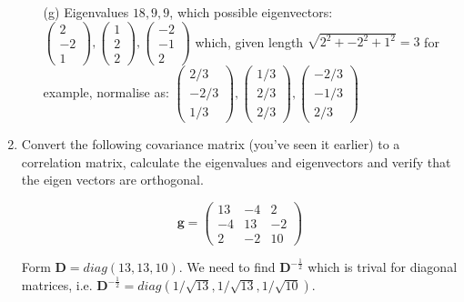 \documentclass{article}
\begin{document}
\begin{enumerate}
\begin{itemize}
\item[(g)] Eigenvalues $18, 9, 9$, which possible eigenvectors:
$\left( \begin{array}{r} 2 \\ -2 \\ 1 \end{array} \right),
\left( \begin{array}{r} 1 \\ 2 \\ 2 \end{array} \right),
\left( \begin{array}{r} -2 \\ -1 \\ 2 \end{array} \right)$ which, given length $\sqrt{2^{2} + -2^{2} + 1^{2}} = 3$ for example, normalise as: 
$\left( \begin{array}{r} 2/3 \\ -2/3 \\ 1/3 \end{array} \right),
\left( \begin{array}{r} 1/3 \\ 2/3 \\ 2/3 \end{array} \right),
\left( \begin{array}{r} -2/3 \\ -1/3 \\ 2/3 \end{array} \right)$

\end{itemize}


\item Convert the following covariance matrix (you've seen it earlier) to a correlation matrix, calculate the eigenvalues and eigenvectors and verify that the eigen vectors are orthogonal.

\begin{displaymath}
\boldsymbol{g} = \left( \begin{array}{rrr} 13 & -4 & 2\\ -4 & 13 & -2 \\ 2 & -2 & 10 \end{array} \right)
\end{displaymath}

Form $\boldsymbol{D} = diag(13, 13, 10)$.   We need to find $\boldsymbol{D}^{-\frac{1}{2}}$ which is trival for diagonal matrices, i.e.  $\boldsymbol{D}^{-\frac{1}{2}} = diag(1/\sqrt{13}, 1/\sqrt{13}, 1/\sqrt{10})$.


\end{enumerate}
\end{document}
